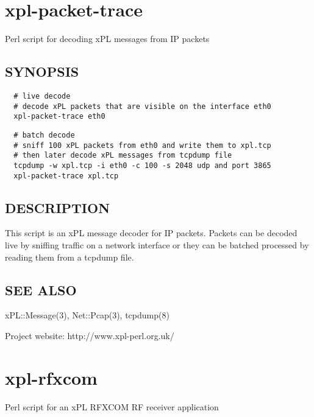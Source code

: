 \section{xpl-packet-trace\label{xpl-packet-trace}}


Perl script for decoding xPL messages from IP packets

\subsection*{SYNOPSIS\label{xpl-packet-trace_SYNOPSIS}}
\begin{verbatim}
  # live decode
  # decode xPL packets that are visible on the interface eth0
  xpl-packet-trace eth0
\end{verbatim}
\begin{verbatim}
  # batch decode
  # sniff 100 xPL packets from eth0 and write them to xpl.tcp
  # then later decode xPL messages from tcpdump file
  tcpdump -w xpl.tcp -i eth0 -c 100 -s 2048 udp and port 3865
  xpl-packet-trace xpl.tcp
\end{verbatim}
\subsection*{DESCRIPTION\label{xpl-packet-trace_DESCRIPTION}}


This script is an xPL message decoder for IP packets.  Packets can be
decoded live by sniffing traffic on a network interface or they can be
batched processed by reading them from a tcpdump file.

\subsection*{SEE ALSO\label{xpl-packet-trace_SEE_ALSO}}


xPL::Message(3), Net::Pcap(3), tcpdump(8)



Project website: http://www.xpl-perl.org.uk/

\section{xpl-rfxcom\label{xpl-rfxcom}}


Perl script for an xPL RFXCOM RF receiver application

